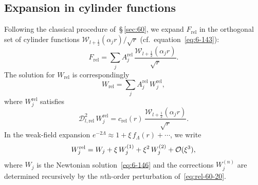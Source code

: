 \subsection{Expansion in cylinder functions}
\label{sec:rel-60-expansion}

Following the classical procedure of~\S\,\ref{sec:60}, we expand
$F_{\mathrm{rel}}$ in the orthogonal set of cylinder functions
$\mathscr{W}_{l+\frac{1}{2}}(\alpha_{j}r)/\sqrt{r}$ (cf.\
equation~\eqref{eq:6-143}):
\begin{equation}\label{eq:rel-60-18}
F_{\mathrm{rel}} = \sum_{j} A_{j}^{\mathrm{rel}}\,
  \frac{\mathscr{W}_{l+\frac{1}{2}}(\alpha_{j}r)}{\sqrt{r}}.
\end{equation}
The solution for $W_{\mathrm{rel}}$ is correspondingly
\begin{equation}\label{eq:rel-60-19}
W_{\mathrm{rel}} = \sum_{j} A_{j}^{\mathrm{rel}}\,W_{j}^{\mathrm{rel}},
\end{equation}
where $W_{j}^{\mathrm{rel}}$ satisfies
\begin{equation}\label{eq:rel-60-20}
\mathscr{D}_{l,\mathrm{rel}}^{2}\,W_{j}^{\mathrm{rel}}
  = c_{\mathrm{rel}}(r)\,
  \frac{\mathscr{W}_{l+\frac{1}{2}}(\alpha_{j}r)}{\sqrt{r}}.
\end{equation}
In the weak-field expansion
$e^{-2\Lambda}\approx 1+\xi\,f_{\Lambda}(r)+\cdots$, we write
\begin{equation}\label{eq:rel-60-21}
W_{j}^{\mathrm{rel}} = W_{j} + \xi\,W_{j}^{(1)} + \xi^{2}\,W_{j}^{(2)}
  + \mathcal{O}(\xi^{3}),
\end{equation}
where $W_{j}$ is the Newtonian solution~\eqref{eq:6-146} and the
corrections $W_{j}^{(n)}$ are determined recursively by the
$n$th-order perturbation of~\eqref{eq:rel-60-20}.

